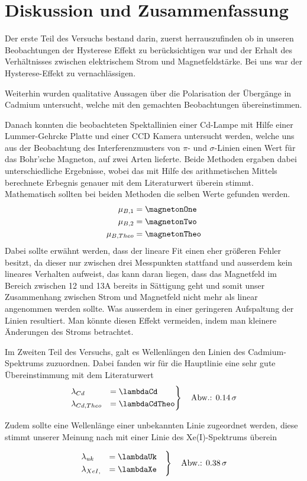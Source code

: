 \section{Diskussion und Zusammenfassung}
  Der erste Teil des Versuchs bestand darin, zuerst herrauszufinden ob in unseren Beobachtungen der Hysterese Effekt zu berücksichtigen war und der Erhalt des Verhältnisses zwischen elektrischem Strom und Magnetfeldstärke.
  Bei uns war der Hysterese-Effekt zu vernachlässigen.

  Weiterhin wurden qualitative Aussagen über die Polarisation der Übergänge in Cadmium untersucht, welche mit den gemachten Beobachtungen übereinstimmen.

  Danach konnten die beobachteten Spektallinien einer Cd-Lampe mit Hilfe einer Lummer-Gehrcke Platte und einer CCD Kamera untersucht werden, welche uns aus der Beobachtung des Interferenzmusters von $\pi$- und $\sigma$-Linien einen Wert für das Bohr'sche Magneton, auf zwei Arten lieferte. Beide Methoden ergaben dabei unterschiedliche Ergebnisse, wobei das mit Hilfe des arithmetischen Mittels berechnete Erbegnis genauer mit dem Literaturwert überein stimmt. Mathematisch sollten bei beiden Methoden die selben Werte gefunden werden.
  \begin{align*}
    \mu_{B,1} &= \magnetonOne\\
    \mu_{B,2} &= \magnetonTwo\\
    \mu_{B,Theo} & = \magnetonTheo
  \end{align*}
  Dabei sollte erwähnt werden, dass der lineare Fit einen eher größeren Fehler besitzt, da dieser nur zwischen drei Messpunkten stattfand und ausserdem kein lineares Verhalten aufweist, das kann daran liegen, dass das Magnetfeld im Bereich zwischen 12 und 13A bereits in Sättigung geht und somit unser Zusammenhang zwischen Strom und Magnetfeld nicht mehr als linear angenommen werden sollte. Was ausserdem in einer geringeren Aufspaltung der Linien resultiert.
  Man könnte diesen Effekt vermeiden, indem man kleinere Änderungen des Stroms betrachtet.

  Im Zweiten Teil des Versuchs, galt es Wellenlängen den Linien des Cadmium-Spektrums zuzuordnen. Dabei fanden wir für die Hauptlinie eine sehr gute Übereinstimmung mit dem Literaturwert
  \begin{align*}
    \begin{rcases}
      \lambda_{Cd} &=\lambdaCd \quad\\
      \lambda_{Cd, Theo} &= \lambdaCdTheo
    \end{rcases}
    \quad\text{Abw.: }\SI{.14}{\sigma}
  \end{align*}

  Zudem sollte eine Wellenlänge einer unbekannten Linie zugeordnet werden, diese stimmt unserer Meinung nach mit einer Linie des Xe(I)-Spektrums überein

  \begin{align*}
    \begin{rcases}
      \lambda_{uk} &= \lambdaUk\quad\\
      \lambda_{Xe I, } &= \lambdaXe
    \end{rcases}
    \quad\text{Abw.: }\SI{.38}{\sigma}
  \end{align*}

